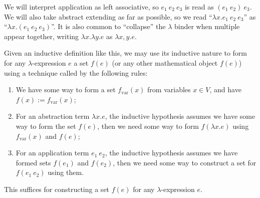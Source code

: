 \begin{node}[Syntax]
\begin{node}\label{untyped-lambda-000T}%
We will interpret application as left associative, so
$e_{1}~e_{2}~e_{3}$ is read as $(e_{1}~e_{2})~e_{3}$. We will also take
abstract extending as far as possible, so we read ``$\lambda x.e_{1}~e_{2}~e_{3}$''
as ``$\lambda x.(e_{1}~e_{2}~e_{3})$''.
It is also common to ``collapse'' the $\lambda$ binder when multiple
appear together, writing $\lambda x.\lambda y.e$ as $\lambda x, y. e$.
\end{node}

\begin{node}\label{untyped-lambda-0009}%
Given an inductive definition like this, we may use its inductive nature
to form for any $\lambda$-expression $e$ a set $f(e)$ (or any other
mathematical object $f(e)$) using a technique
called  by the following rules:
\begin{enumerate}
\item We have some way to form a set $f_{\text{var}}(x)$ from variables
  $x\in V$, and have $f(x):=f_{\text{var}}(x)$;
\item For an abstraction term $\lambda x.e$, the inductive hypothesis
  assumes we have some way to form the set $f(e)$, then we need some way
  to form $f(\lambda x.e)$ using $f_{\text{var}}(x)$ and $f(e)$;
\item For an application term $e_{1}~e_{2}$, the inductive hypothesis
  assumes we have formed sets $f(e_{1})$ and $f(e_{2})$, then we need
  some way to construct a set for $f(e_{1}~e_{2})$ using them.
\end{enumerate}
This suffices for constructing a set $f(e)$ for any $\lambda$-expression $e$.


\end{node}
\end{node}
